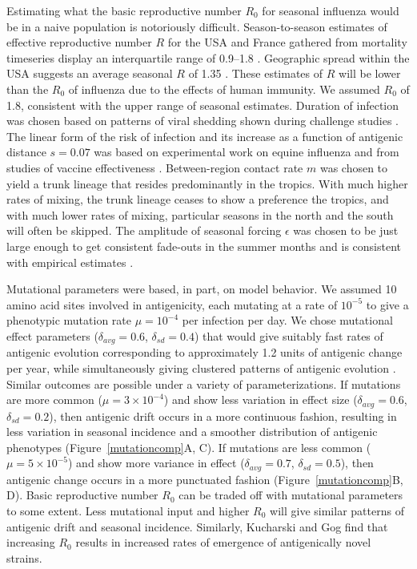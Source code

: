 \documentclass[11pt,oneside,letterpaper]{article}
\begin{document}
Estimating what the basic reproductive number $R_0$ for seasonal influenza would be in a naive population is notoriously difficult.  Season-to-season estimates of effective reproductive number $R$ for the USA and France gathered from mortality timeseries display an interquartile range of 0.9--1.8 \cite{Chowell08}.  Geographic spread within the USA suggests an average seasonal $R$ of 1.35 \cite{Viboud06}.  These estimates of $R$ will be lower than the $R_0$ of influenza due to the effects of human immunity.  We assumed $R_0$ of 1.8, consistent with the upper range of seasonal estimates.  Duration of infection was chosen based on patterns of viral shedding shown during challenge studies \cite{Carrat08}.  The linear form of the risk of infection and its increase as a function of antigenic distance $s = 0.07$ was based on experimental work on equine influenza \cite{Park09} and from studies of vaccine effectiveness \cite{Gupta06}.  Between-region contact rate $m$ was chosen to yield a trunk lineage that resides predominantly in the tropics.  With much higher rates of mixing, the trunk lineage ceases to show a preference the tropics, and with much lower rates of mixing, particular seasons in the north and the south will often be skipped.  The amplitude of seasonal forcing $\epsilon$ was chosen to be just large enough to get consistent fade-outs in the summer months and is consistent with empirical estimates \cite{Truscott11}.

Mutational parameters were based, in part, on model behavior.  We assumed 10 amino acid sites involved in antigenicity, each mutating at a rate of $10^{-5}$ \cite{Rambaut08} to give a phenotypic mutation rate $\mu = 10^{-4}$ per infection per day.  We chose mutational effect parameters ($\delta_{avg} = 0.6$, $\delta_{sd} = 0.4$) that would give suitably fast rates of antigenic evolution corresponding to approximately 1.2 units of antigenic change per year, while simultaneously giving clustered patterns of antigenic evolution  \cite{Smith04}.  Similar outcomes are possible under a variety of parameterizations.  If mutations are more common ($\mu = 3 \times 10^{-4}$) and show less variation in effect size ($\delta_{avg} = 0.6$, $\delta_{sd} = 0.2$), then antigenic drift occurs in a more continuous fashion, resulting in less variation in seasonal incidence and a smoother distribution of antigenic phenotypes (Figure~\ref{mutationcomp}A, C).  If mutations are less common ($\mu = 5 \times 10^{-5}$) and show more variance in effect ($\delta_{avg} = 0.7$, $\delta_{sd} = 0.5$), then antigenic change occurs in a more punctuated fashion (Figure~\ref{mutationcomp}B, D).  Basic reproductive number $R_0$ can be traded off with mutational parameters to some extent.  Less mutational input and higher $R_0$ will give similar patterns of antigenic drift and seasonal incidence.  Similarly, Kucharski and Gog \cite{Kucharski12} find that increasing $R_0$ results in increased rates of emergence of antigenically novel strains.
\end{document}
